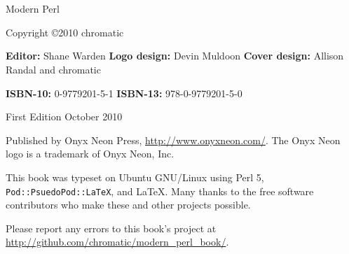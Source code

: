 \chapter*{}
\thispagestyle{empty}

\huge{Modern Perl}
\newline
\newline
\newline
\normalsize

Copyright \copyright 2010 chromatic

\textbf{Editor:} Shane Warden\newline
\textbf{Logo design:} Devin Muldoon\newline
\textbf{Cover design:} Allison Randal and chromatic

\textbf{ISBN-10:} 0-9779201-5-1\newline
\textbf{ISBN-13:} 978-0-9779201-5-0

First Edition October 2010

Published by Onyx Neon Press, \url{http://www.onyxneon.com/}.
The Onyx Neon logo is a trademark of Onyx Neon, Inc.

This book was typeset on Ubuntu GNU/Linux using Perl 5,
\textnhtt{Pod::PsuedoPod::LaTeX}, and LaTeX. Many thanks to the free software
contributors who make these and other projects possible.

Please report any errors to this book's project at \url{http://github.com/chromatic/modern_perl_book/}.
